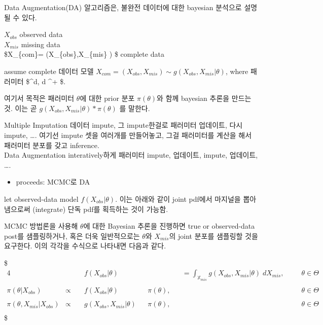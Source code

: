 \documentclass[
]{book}
\providecommand{\tightlist}{%
  \setlength{\itemsep}{0pt}\setlength{\parskip}{0pt}}
\begin{document}
Data Augmentation(DA) 알고리즘은, 불완전 데이터에 대한 bayesian 분석으로 설명될 수 있다.

\(X_{obs}\) \textbar{} observed data \textbar{}\\
\(X_{mis}\) \textbar{} missing data \textbar{}\\
\$X\_\{com\}= \left(X\_\{obs\},X\_\{mis\} \right) \$ \textbar{} complete data \textbar{}

assume complete 데이터 모델 \(X_{com} = (X_{obs}, X_{mis}) \sim g \left( X_{obs}, X_{mis} \rvert \theta \right)\), where 패러미터 \$\theta \in \Theta \subseteq {}\^{}d, d \in {}\^{}+ \$.

여기서 목적은 패러미터 \(\theta\)에 대한 prior 분포 \(\pi (\theta)\)와 함께 bayesian 추론을 만드는 것. 이는 곧 \(g \left( X_{obs}, X_{mis} \rvert \theta \right) \ast \pi(\theta)\) 를 말한다.

Multiple Imputation \textbar{} 데이터 impute, 그 impute한걸로 패러미터 업데이트, 다시 impute, \ldots. 여기선 impute 셋을 여러개를 만들어놓고, 그걸 패러미터를 계산을 해서 패러미터 분포를 갖고 inference. \textbar{}\\
Data Augmentation \textbar{} interatively하게 패러미터 impute, 업데이트, impute, 업데이트, \ldots. \textbar{}

\begin{itemize}
\tightlist
\item
  proceeds: MCMC로 DA
\end{itemize}

let observed-data model \(f(X_{obs} \rvert \theta)\). 이는 아래와 같이 joint pdf에서 마지널을 뽑아냄으로써 (integrate) 단독 pdf를 획득하는 것이 가능함.

MCMC 방법론을 사용해 \(\theta\)에 대한 Bayesian 추론을 진행하면 true or observed-data post를 샘플링하거나, 혹은 더욱 일반적으로는 \(\theta\)와 \(X_{mis}\)의 joint 분포를 샘플링할 것을 요구한다. 이의 각각을 수식으로 나타내면 다음과 같다.

\$
\begin{alignat}{4}

& &&f(X_{obs} \rvert \theta) && &&= \int_{\mathbb{X}_{mis}} g(X_{obs}, X_{mis} \rvert \theta) \; dX_{mis}, \; \; \; && \theta \in \Theta \\ 

\\

\pi (\theta \lvert X_{obs}) &\propto \; &&f (X_{obs} \lvert \theta) && \pi(\theta), && \; \; \; \; \; \; \; && \theta \in \Theta \tag{1}\\

\\

\pi (\theta, X_{mis} \lvert X_{obs}) &\propto \; &&g (X_{obs}, X_{mis} \lvert \theta) && \pi(\theta), && \; \; \; \; \; \; \; && \theta \in \Theta \tag{2}\\

\end{alignat}
\$
\end{document}
